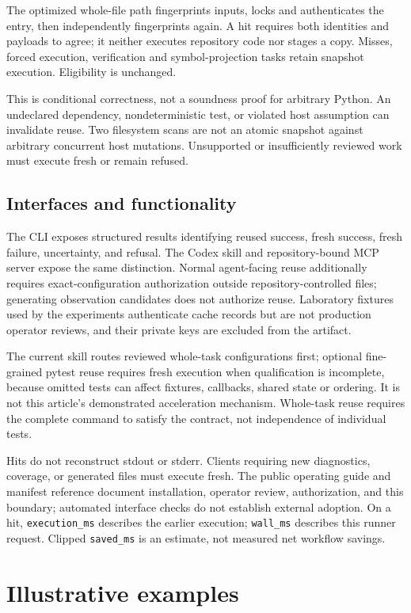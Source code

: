 \documentclass[preprint,12pt,a4paper]{elsarticle}
\newcommand{\code}[1]{\texttt{#1}}
\begin{document}
The optimized whole-file path fingerprints inputs, locks and authenticates the entry, then independently fingerprints again. A hit requires both identities and payloads to agree; it neither executes repository code nor stages a copy. Misses, forced execution, verification and symbol-projection tasks retain snapshot execution. Eligibility is unchanged.

This is conditional correctness, not a soundness proof for arbitrary Python. An undeclared dependency, nondeterministic test, or violated host assumption can invalidate reuse. Two filesystem scans are not an atomic snapshot against arbitrary concurrent host mutations. Unsupported or insufficiently reviewed work must execute fresh or remain refused.

\subsection{Interfaces and functionality}
The CLI exposes structured results identifying reused success, fresh success, fresh failure, uncertainty, and refusal. The Codex skill and repository-bound MCP server expose the same distinction. Normal agent-facing reuse additionally requires exact-configuration authorization outside repository-controlled files; generating observation candidates does not authorize reuse. Laboratory fixtures used by the experiments authenticate cache records but are not production operator reviews, and their private keys are excluded from the artifact.

The current skill routes reviewed whole-task configurations first; optional fine-grained pytest reuse requires fresh execution when qualification is incomplete, because omitted tests can affect fixtures, callbacks, shared state or ordering. It is not this article's demonstrated acceleration mechanism. Whole-task reuse requires the complete command to satisfy the contract, not independence of individual tests.

Hits do not reconstruct stdout or stderr. Clients requiring new diagnostics, coverage, or generated files must execute fresh. The public operating guide and manifest reference document installation, operator review, authorization, and this boundary; automated interface checks do not establish external adoption. On a hit, \code{execution\_ms} describes the earlier execution; \code{wall\_ms} describes this runner request. Clipped \code{saved\_ms} is an estimate, not measured net workflow savings.

\section{Illustrative examples}
\end{document}
